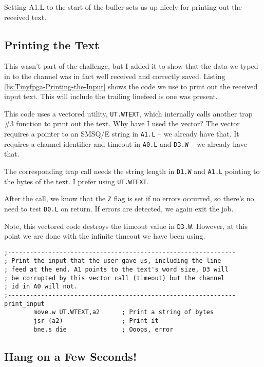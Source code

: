 Setting A1.L to the start of the buffer sets us up nicely for printing
out the received text.

\subsection{Printing the Text}

This wasn't part of the challenge, but I added it to show that the
data we typed in to the channel was in fact well received and correctly
saved. Listing \ref{lis:Tinyfpga-Printing-the-Input} shows the code
we use to print out the received input text. This will include the
trailing linefeed is one was present.

This code uses a vectored utility, \texttt{UT.WTEXT}, which internally
calls another trap \#3 function to print out the text. Why have I
used the vector? The vector requires a pointer to an SMSQ/E string
in \texttt{A1.L} -- we already have that. It requires a channel identifier
and timeout in \texttt{A0.L} and \texttt{D3.W} -- we already have
that.

The corresponding trap call needs the string length in \texttt{D1.W}
and \texttt{A1.L} pointing to the bytes of the text. I prefer using
\texttt{UT.WTEXT}.

After the call, we know that the \texttt{Z} flag is set if no errors
occurred, so there's no need to test \texttt{D0.L} on return. If errors
are detected, we again exit the job.

Note, this vectored code destroys the timeout value in \texttt{D3.W}.
However, at this point we are done with the infinite timeout we have
been using.

\begin{lstlisting}[caption={Tinyfpga - Printing the Input},label={lis:Tinyfpga-Printing-the-Input}]
;--------------------------------------------------------------
; Print the input that the user gave us, including the line
; feed at the end. A1 points to the text's word size, D3 will
; be corrupted by this vector call (timeout) but the channel
; id in A0 will not.
;--------------------------------------------------------------
print_input
        move.w UT.WTEXT,a2      ; Print a string of bytes
        jsr (a2)                ; Print it
        bne.s die               ; Ooops, error

\end{lstlisting}


\subsection{Hang on a Few Seconds!}

